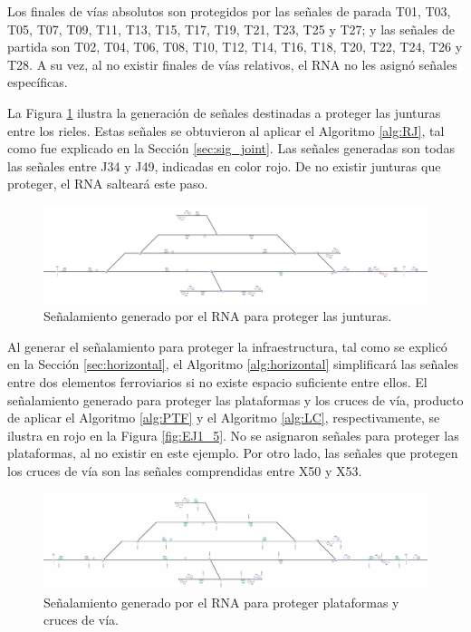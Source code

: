	Los finales de vías absolutos son protegidos por las señales de parada T01, T03, T05, T07, T09, T11, T13, T15, T17, T19, T21, T23, T25 y T27; y las señales de partida son T02, T04, T06, T08, T10, T12, T14, T16, T18, T20, T22, T24, T26 y T28. A su vez, al no existir finales de vías relativos, el RNA no les asignó señales específicas.
	
	La Figura \ref{fig:EJ4_4} ilustra la generación de señales destinadas a proteger las junturas entre los rieles. Estas señales se obtuvieron al aplicar el Algoritmo \ref{alg:RJ}, tal como fue explicado en la Sección \ref{sec:sig_joint}. Las señales generadas son todas las señales entre J34 y J49, indicadas en color rojo. De no existir junturas que proteger, el RNA salteará este paso.

	\begin{figure}[H]
		\centering
		\includegraphics[width=1\textwidth]{resultados-obtenidos/ejemplo4/images/4_step2.png}
		\centering\caption{Señalamiento generado por el RNA para proteger las junturas.}
		\label{fig:EJ4_4}
	\end{figure}

	Al generar el señalamiento para proteger la infraestructura, tal como se explicó en la Sección \ref{sec:horizontal}, el Algoritmo \ref{alg:horizontal} simplificará las señales entre dos elementos ferroviarios si no existe espacio suficiente entre ellos. El señalamiento generado para proteger las plataformas y los cruces de vía, producto de aplicar el Algoritmo \ref{alg:PTF} y el Algoritmo \ref{alg:LC}, respectivamente, se ilustra en rojo en la Figura \ref{fig:EJ1_5}. No se asignaron señales para proteger las plataformas, al no existir en este ejemplo. Por otro lado, las señales que protegen los cruces de vía son las señales comprendidas entre X50 y X53.

	\begin{figure}[H]
		\centering
		\includegraphics[width=1\textwidth]{resultados-obtenidos/ejemplo4/images/4_step3.png}
		\centering\caption{Señalamiento generado por el RNA para proteger plataformas y cruces de vía.}
		\label{fig:EJ4_5}
	\end{figure}

